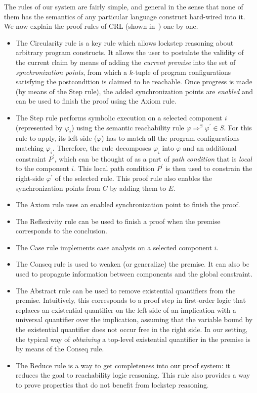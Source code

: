 The rules of our system are fairly simple, and general in the sense that none of them has the semantics of any particular language construct
hard-wired into it.
We now explain the proof rules of CRL (shown in~) one by one.
\begin{itemize}
  \item The Circularity rule is a key rule which allows lockstep reasoning about arbitrary program constructs.
        It allows the user to postulate the validity of the current claim by means of adding the \emph{current premise}
        into the set of \emph{synchronization points}, from which a $k$-tuple of program configurations satisfying the postcondition
        is claimed to be reachable. Once progress is made (by means of the Step rule), the added synchronization points are
        \emph{enabled} and can be used to finish the proof using the Axiom rule.
  \item The Step rule performs symbolic execution on a selected component $i$ (represented by $\varphi_i$)
        using the semantic reachability rule $\varphi \Rightarrow^\exists \varphi^\prime \in S$.
        For this rule to apply, its left side ($\varphi$) has to match all the program configurations matching $\varphi_i$.
        Therefore, the rule decomposes $\varphi_i$ into $\varphi$ and an additional constraint $P^\prime$,
        which can be thought of as a part of \emph{path condition} that is \emph{local} to the component $i$.
        This local path condition $P^\prime$ is then used to constrain the right-side $\varphi^\prime$ of the selected rule.
        This proof rule also enables the synchronization points from $C$ by adding them to $E$.
  \item The Axiom rule uses an enabled synchronization point to finish the proof.
  \item The Reflexivity rule can be used to finish a proof when the premise corresponds to the conclusion.
  \item The Case rule implements case analysis on a selected component $i$.
  \item The Conseq rule is used to weaken (or generalize) the premise. It can also be used
        to propagate information between components and the global constraint.
  \item The Abstract rule can be used to remove existential quantifiers from the premise.
        Intuitively, this corresponds to a proof step in first-order logic that replaces
        an existential quantifier on the left side of an implication
        with a universal quantifier over the implication, assuming that the variable
        bound by the existential quantifier does not occur free in the right side.
        In our setting, the typical way of \emph{obtaining} a top-level existential quantifier in the premise
        is by means of the Conseq rule.
  \item The Reduce rule is a way to get completeness into our proof system:
        it reduces the goal to reachability logic reasoning.
        This rule also provides a way to prove properties that do not benefit
        from lockstep reasoning.
\end{itemize}


